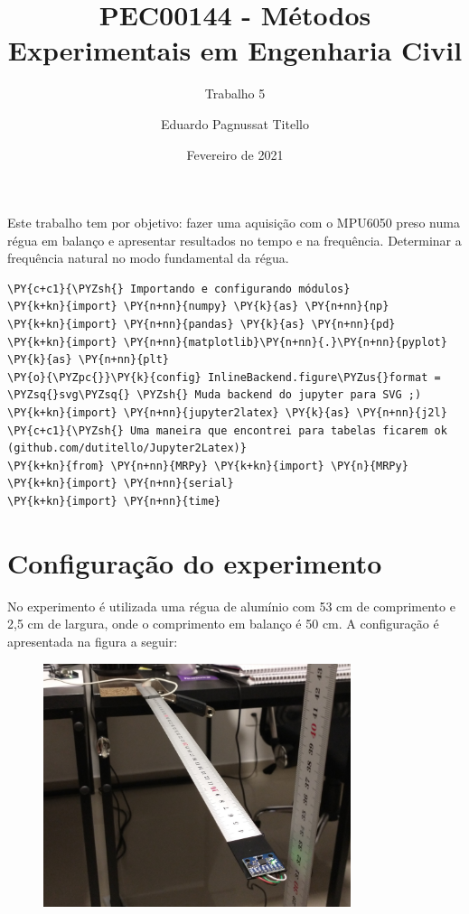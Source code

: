 

\author{Eduardo Pagnussat Titello}
\title{PEC00144 - Métodos Experimentais em Engenharia Civil}
\subtitle{Trabalho 5}
\date{Fevereiro de 2021}


	
	\maketitle

Este trabalho tem por objetivo: fazer uma aquisição com o MPU6050 preso
numa régua em balanço e apresentar resultados no tempo e
na frequência. Determinar a frequência natural no modo fundamental da
régua.

    \begin{tcolorbox}[breakable, size=fbox, boxrule=1pt, pad at break*=1mm,colback=cellbackground, colframe=cellborder]
\begin{Verbatim}[commandchars=\\\{\}]
\PY{c+c1}{\PYZsh{} Importando e configurando módulos}
\PY{k+kn}{import} \PY{n+nn}{numpy} \PY{k}{as} \PY{n+nn}{np}
\PY{k+kn}{import} \PY{n+nn}{pandas} \PY{k}{as} \PY{n+nn}{pd} 
\PY{k+kn}{import} \PY{n+nn}{matplotlib}\PY{n+nn}{.}\PY{n+nn}{pyplot} \PY{k}{as} \PY{n+nn}{plt}
\PY{o}{\PYZpc{}}\PY{k}{config} InlineBackend.figure\PYZus{}format = \PYZsq{}svg\PYZsq{} \PYZsh{} Muda backend do jupyter para SVG ;)
\PY{k+kn}{import} \PY{n+nn}{jupyter2latex} \PY{k}{as} \PY{n+nn}{j2l} \PY{c+c1}{\PYZsh{} Uma maneira que encontrei para tabelas ficarem ok (github.com/dutitello/Jupyter2Latex)}
\PY{k+kn}{from} \PY{n+nn}{MRPy} \PY{k+kn}{import} \PY{n}{MRPy}
\PY{k+kn}{import} \PY{n+nn}{serial}
\PY{k+kn}{import} \PY{n+nn}{time}
\end{Verbatim}
\end{tcolorbox}

    \hypertarget{configurauxe7uxe3o-do-experimento}{%
\section{Configuração do
experimento}\label{configurauxe7uxe3o-do-experimento}}

No experimento é utilizada uma régua de alumínio com 53 cm de
comprimento e 2,5 cm de largura, onde o comprimento em balanço é 50 cm.
A configuração é apresentada na figura a seguir:

\begin{figure}
\centering
\includegraphics[width=9cm]{../Trabalho5/imagens/conf1}
\end{figure}

